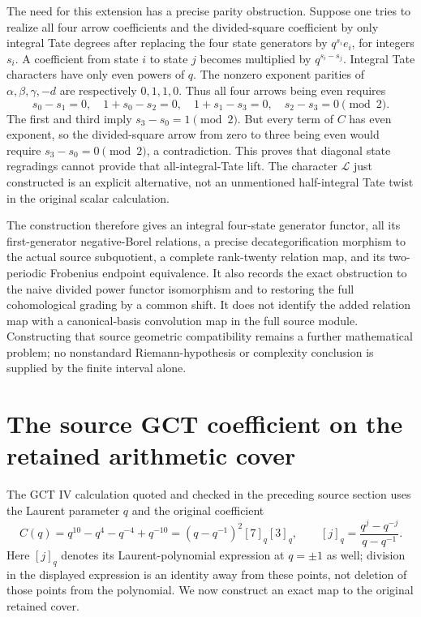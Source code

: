 The need for this extension has a precise parity obstruction. Suppose
one tries to realize all four arrow coefficients and the divided-square
coefficient by only integral Tate degrees after replacing the four
state generators by \(q^{s_i}e_i\), for integers \(s_i\). A coefficient
from state \(i\) to state \(j\) becomes multiplied by
\(q^{s_i-s_j}\). Integral Tate characters have only even powers of
\(q\). The nonzero exponent parities of \(\alpha,\beta,\gamma,-d\)
are respectively \(0,1,1,0\). Thus all four arrows being even requires
\[
 s_0-s_1=0,\quad 1+s_0-s_2=0,\quad
 1+s_1-s_3=0,\quad s_2-s_3=0\pmod2.
\]
The first and third imply \(s_3-s_0=1\pmod2\). But every term of
\(C\) has even exponent, so the divided-square arrow from zero to
three being even would require \(s_3-s_0=0\pmod2\), a contradiction.
This proves that diagonal state regradings cannot provide that
all-integral-Tate lift. The character \(\mathcal L\) just constructed
is an explicit alternative, not an unmentioned half-integral Tate
twist in the original scalar calculation.

The construction therefore gives an integral four-state generator
functor, all its first-generator negative-Borel relations, a precise
decategorification morphism to the actual source subquotient, a complete
rank-twenty relation map, and its two-periodic Frobenius endpoint
equivalence. It also records the exact obstruction to the naive divided
power functor isomorphism and to restoring the full cohomological
grading by a common shift. It does not identify the added relation map
with a canonical-basis convolution map in the full source module.
Constructing that source geometric compatibility remains a further
mathematical problem; no nonstandard Riemann-hypothesis or complexity
conclusion is supplied by the finite interval alone.

\section{The source GCT coefficient on the retained arithmetic cover}
\label{sec:conic-arithmetic}
The GCT IV calculation quoted and checked in the preceding source
section uses the Laurent parameter $q$ and the original coefficient
\[
 C(q)=q^{10}-q^4-q^{-4}+q^{-10}
 =(q-q^{-1})^2[7]_q[3]_q,\qquad
 [j]_q=\frac{q^j-q^{-j}}{q-q^{-1}}.
\]
Here $[j]_q$ denotes its Laurent-polynomial expression at $q=\pm1$
as well; division in the displayed expression is an identity away
from these points, not deletion of those points from the polynomial.
We now construct an exact map to the original retained cover.

